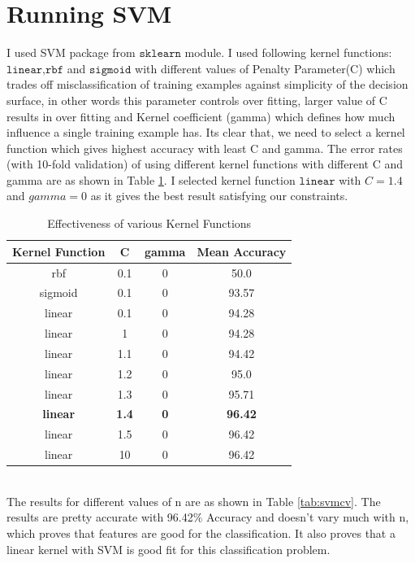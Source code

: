 \documentclass[11pt, pdftex]{article}
\begin{document}
\section{Running SVM}
I used SVM package from $\texttt{sklearn}$ module. I used following kernel functions: $\texttt{linear,rbf}$ and   $\texttt{sigmoid}$ with different values of Penalty Parameter(C) which trades off misclassification of training examples against simplicity of the decision surface, in other words this parameter controls over fitting, larger value of C results in over fitting and Kernel coefficient (gamma) which defines how much influence a single training example has. Its clear that, we need to select a kernel function which gives highest accuracy with least C and gamma. The error rates (with 10-fold validation) of using different kernel functions with different C and gamma are as shown in Table \ref{tab:kerf}. I selected kernel function $\texttt{linear}$ with $C = 1.4$ and $gamma = 0$ as it gives the best result satisfying our constraints.
\begin{table}
\centering
\begin{tabular}{ | c | c | c | c |}
    \hline
    {\bf Kernel Function} & {\bf C} & {\bf gamma} & {\bf Mean Accuracy}\\ 
    \hline
    rbf & 0.1 & 0 & 50.0\\
	\hline
	sigmoid & 0.1 & 0 & 93.57\\
	\hline
	linear & 0.1 & 0 & 94.28\\
	\hline
	linear & 1 & 0 & 94.28 \\
	\hline
	linear & 1.1 & 0 & 94.42\\
	\hline
	linear & 1.2 & 0 & 95.0\\
	\hline
	linear & 1.3 & 0 & 95.71\\
	\hline
	{\bf linear} & {\bf 1.4} & {\bf 0} & {\bf 96.42}\\
	\hline
	linear & 1.5 & 0 & 96.42\\
	\hline
	linear & 10 & 0 & 96.42\\
	\hline
	\end{tabular}
	\caption{Effectiveness of various Kernel Functions}
    \label{tab:kerf}
\end{table}
\\
The results for different values of n are as shown in Table \ref{tab:svmcv}. The results are pretty accurate with 96.42$\%$ Accuracy and doesn't vary much with n, which proves that features are good for the classification. It also proves that a linear kernel with SVM is good fit for this classification problem.
\end{document}
